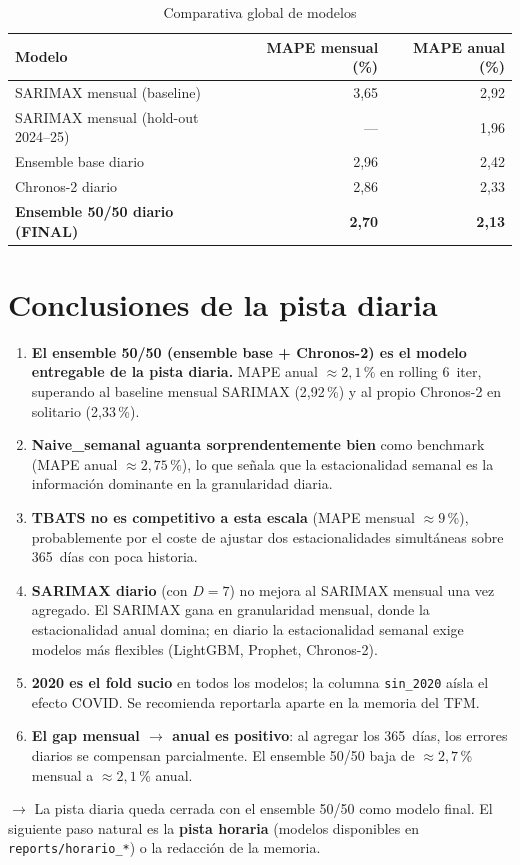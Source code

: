 \documentclass[12pt,a4paper]{article}
\begin{document}
\begin{table}[H]
\centering
\caption{Comparativa global de modelos}
\begin{tabular}{lrr}
\toprule
Modelo & MAPE mensual (\%) & MAPE anual (\%) \\
\midrule
SARIMAX mensual (baseline)             & 3{,}65 & 2{,}92 \\
SARIMAX mensual (hold-out 2024--25)    & ---    & 1{,}96 \\
Ensemble base diario                   & 2{,}96 & 2{,}42 \\
Chronos-2 diario                       & 2{,}86 & 2{,}33 \\
\textbf{Ensemble 50/50 diario (FINAL)} & \textbf{2{,}70} & \textbf{2{,}13} \\
\bottomrule
\end{tabular}
\end{table}

\section{Conclusiones de la pista diaria}

\begin{enumerate}
  \item \textbf{El ensemble 50/50 (ensemble base + Chronos-2) es el modelo
        entregable de la pista diaria.} MAPE anual $\approx 2{,}1$\,\% en
        rolling 6~iter, superando al baseline mensual SARIMAX (2{,}92\,\%)
        y al propio Chronos-2 en solitario (2{,}33\,\%).

  \item \textbf{Naive\_semanal aguanta sorprendentemente bien} como benchmark
        (MAPE anual $\approx 2{,}75$\,\%), lo que señala que la estacionalidad
        semanal es la información dominante en la granularidad diaria.

  \item \textbf{TBATS no es competitivo a esta escala} (MAPE mensual
        $\approx 9$\,\%), probablemente por el coste de ajustar dos
        estacionalidades simultáneas sobre 365~días con poca historia.

  \item \textbf{SARIMAX diario} (con $D=7$) no mejora al SARIMAX mensual
        una vez agregado. El SARIMAX gana en granularidad mensual, donde
        la estacionalidad anual domina; en diario la estacionalidad semanal
        exige modelos más flexibles (LightGBM, Prophet, Chronos-2).

  \item \textbf{2020 es el fold sucio} en todos los modelos; la columna
        \texttt{sin\_2020} aísla el efecto COVID. Se recomienda reportarla
        aparte en la memoria del TFM.

  \item \textbf{El gap mensual $\to$ anual es positivo}: al agregar los
        365~días, los errores diarios se compensan parcialmente. El ensemble
        50/50 baja de $\approx 2{,}7$\,\% mensual a $\approx 2{,}1$\,\%
        anual.
\end{enumerate}

\bigskip
\noindent
$\to$ La pista diaria queda cerrada con el ensemble 50/50 como modelo final.
El siguiente paso natural es la \textbf{pista horaria} (modelos disponibles
en \texttt{reports/horario\_*}) o la redacción de la memoria.
\end{document}
